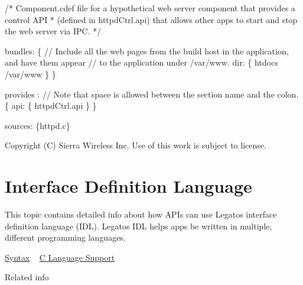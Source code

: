\begin{DoxyCode}
\textcolor{comment}{/* Component.cdef file for a hypothetical web server component that provides a control API}
\textcolor{comment}{ * (defined in httpdCtrl.api) that allows other apps to start and stop the web server via IPC.}
\textcolor{comment}{ */}

bundles:
\{
    \textcolor{comment}{// Include all the web pages from the build host in the application, and have them appear}
    \textcolor{comment}{// to the application under /var/www.}
    dir:
    \{
        htdocs   /var/www
    \}
\}

provides :     \textcolor{comment}{// Note that space is allowed between the section name and the colon.}
\{
    api:    \{   httpdCtrl.api
            \}
\}

sources: \{httpd.c\}
\end{DoxyCode}






Copyright (C) Sierra Wireless Inc. Use of this work is subject to license. \hypertarget{interfaceDefLang}{}\section{Interface Definition Language}\label{interfaceDefLang}
This topic contains detailed info about how A\+P\+Is can use Legato\textquotesingle{}s interface definition language (I\+D\+L). Legato\textquotesingle{}s I\+D\+L helps apps be written in multiple, different programming languages.





\hyperlink{interfaceDefLangSyntax}{Syntax} ~\newline
 \hyperlink{interfaceDefLangC}{C Language Support} ~\newline






Related info

